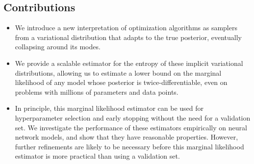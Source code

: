 \documentclass[]{article}
\begin{document}
\subsection{Contributions}
\begin{itemize}
\item We introduce a new interpretation of optimization algorithms as samplers from a variational distribution that adapts to the true posterior, eventually collapsing around its modes.
\item We provide a scalable estimator for the entropy of these implicit variational distributions, allowing us to estimate a lower bound on the marginal likelihood of any model whose posterior is twice-differentiable, even on problems with millions of parameters and data points.
\item In principle, this marginal likelihood estimator can be used for hyperparameter selection and early stopping without the need for a validation set.
We investigate the performance of these estimators empirically on neural network models, and show that they have reasonable properties.
However, further refinements are likely to be necessary before this marginal likelihood estimator is more practical than using a validation set.
\end{itemize}
\end{document}
